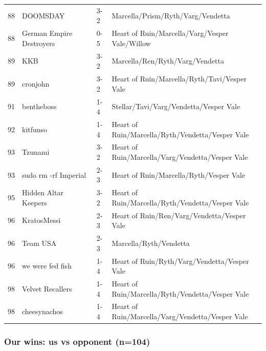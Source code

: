 \documentclass[
  10pt,
]{article}
\begin{document}
{\begin{longtable}[]{@{}llll@{}}
88 & DOOMSDAY & 3-2 & Marcella/Prism/Ryth/Varg/Vendetta \\
88 & German Empire Destroyers & 0-5 & Heart of Ruin/Marcella/Varg/Vesper
Vale/Willow \\
89 & KKB & 3-2 & Marcella/Ren/Ryth/Varg/Vendetta \\
89 & cronjohn & 3-2 & Heart of Ruin/Marcella/Ryth/Tavi/Vesper Vale \\
91 & bentheboss & 1-4 & Stellar/Tavi/Varg/Vendetta/Vesper Vale \\
92 & kitfunso & 1-4 & Heart of Ruin/Marcella/Ryth/Vendetta/Vesper
Vale \\
93 & Tzunami & 3-2 & Heart of Ruin/Marcella/Varg/Vendetta/Vesper Vale \\
93 & sudo rm -rf Imperial & 2-3 & Heart of Ruin/Marcella/Ryth/Vesper
Vale \\
95 & Hidden Altar Keepers & 3-2 & Heart of
Ruin/Marcella/Ryth/Vendetta/Vesper Vale \\
96 & KratosMessi & 2-3 & Heart of Ruin/Ren/Varg/Vendetta/Vesper Vale \\
96 & Team USA & 2-3 & Marcella/Ryth/Vendetta \\
96 & we were fed fish & 1-4 & Heart of Ruin/Ryth/Varg/Vendetta/Vesper
Vale \\
98 & Velvet Recallers & 1-4 & Heart of
Ruin/Marcella/Ryth/Vendetta/Vesper Vale \\
98 & cheesynachos & 1-4 & Heart of Ruin/Marcella/Varg/Vendetta/Vesper
Vale \\
\end{longtable}
}

\subsubsection{Our wins: us vs opponent
(n=104)}\label{our-wins-us-vs-opponent-n104}
\end{document}

